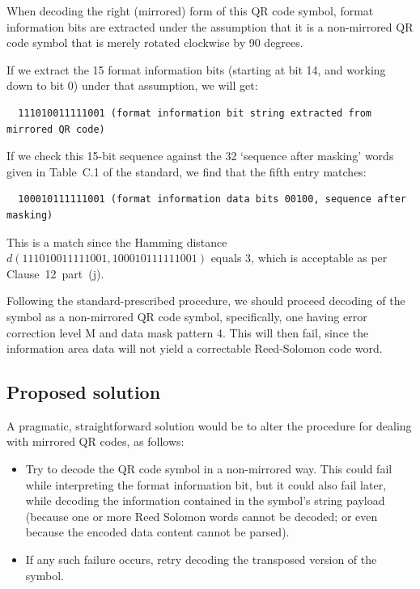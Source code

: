 \documentclass[a4paper,twoside]{article}
\begin{document}
When decoding the right (mirrored) form of this QR code symbol, format information bits are extracted under the
assumption that it is a non-mirrored QR code symbol that is merely rotated clockwise by 90 degrees.

If we extract the 15 format information bits (starting at bit 14, and working down to bit 0) under that assumption,
we will get:

\begin{verbatim}
  111010011111001 (format information bit string extracted from mirrored QR code)
\end{verbatim}

If we check this 15-bit sequence against the 32 `sequence after masking' words given in Table~C.1 of the standard, we find that the fifth entry matches:

\begin{verbatim}
  100010111111001 (format information data bits 00100, sequence after masking) 
\end{verbatim}

This is a match since the Hamming distance $d(111010011111001,100010111111001)$ equals 3, which is acceptable as per Clause~12~part~(j).

Following the standard-prescribed procedure, we should proceed decoding of the symbol as a non-mirrored QR code symbol, specifically,
one having error correction level M and data mask pattern 4. This will then fail, since the information area data will not yield a
correctable Reed-Solomon code word.

\subsection{Proposed solution}

A pragmatic, straightforward solution would be to alter the procedure for dealing with mirrored QR codes, as follows:

\begin{itemize}
\item Try to decode the QR code symbol in a non-mirrored way. This could fail while interpreting the format information bit,
      but it could also fail later, while decoding the information contained in the symbol's string payload (because one or
      more Reed Solomon words cannot be decoded; or even because the encoded data content cannot be parsed).
\item If any such failure occurs, retry decoding the transposed version of the symbol.
\end{itemize}
\end{document}

